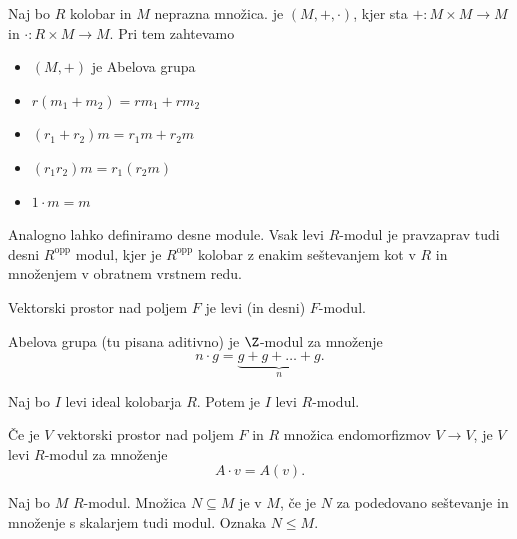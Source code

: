 
\begin{definicija}
  Naj bo $R$ kolobar in $M$ neprazna množica.
   je $(M, +, \cdot)$, kjer sta $+ : M \times M \to M$ in
  $\cdot : R \times M \to M$.
  Pri tem zahtevamo
  \begin{itemize}
  \item $(M, +)$ je Abelova grupa
  \item $r(m_1 + m_2) = r m_1 + r m_2$
  \item $(r_1 + r_2) m = r_1 m + r_2 m$
  \item $(r_1 r_2) m = r_1 (r_2 m)$
  \item $1 \cdot m = m$
  \end{itemize}
\end{definicija}

Analogno lahko definiramo desne module.
Vsak levi $R$-modul je pravzaprav tudi desni $R^{\text{opp}}$ modul, kjer je
$R^{\text{opp}}$ kolobar z enakim seštevanjem kot v $R$ in množenjem v obratnem
vrstnem redu.


\begin{primer}
  Vektorski prostor nad poljem $F$ je levi (in desni) $F$-modul.
\end{primer}

\begin{primer}
  Abelova grupa (tu pisana aditivno) je $\Z$-modul za množenje
  \[
	n \cdot g = \underbrace{g + g + \ldots + g}_{n}.
  \]
\end{primer}

\begin{primer}
  Naj bo $I$ levi ideal kolobarja $R$.
  Potem je $I$ levi $R$-modul.
\end{primer}

\begin{primer}
  Če je $V$ vektorski prostor nad poljem $F$ in $R$ množica endomorfizmov $V \to
  V$, je $V$ levi $R$-modul za množenje
  \[
	A \cdot v = A(v).
  \]
\end{primer}


\begin{definicija}
  Naj bo $M$ $R$-modul.
  Množica $N \subseteq M$ je  v $M$, če je $N$ za podedovano
  seštevanje in množenje s skalarjem tudi modul.
  Oznaka $N \le M$.
\end{definicija}

